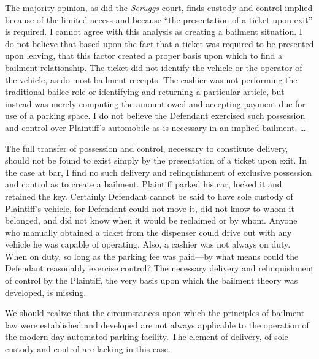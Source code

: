 The majority opinion, as did the \textit{Scruggs} court, finds custody and
control implied because of the limited access and because ``the presentation of
a ticket upon exit'' is required. I cannot agree with this analysis as creating
a bailment situation. I do not believe that based upon the fact that a ticket
was required to be presented upon leaving, that this factor created a proper
basis upon which to find a bailment relationship. The ticket did not identify
the vehicle or the operator of the vehicle, as do most bailment receipts. The
cashier was not performing the traditional bailee role or identifying and
returning a particular article, but instead was merely computing the amount
owed and accepting payment due for use of a parking space. I do not believe the
Defendant exercised such possession and control over Plaintiff's automobile as
is necessary in an implied bailment. \ldots

The full transfer of possession and control, necessary to constitute delivery,
should not be found to exist simply by the presentation of a ticket upon exit.
In the case at bar, I find no such delivery and relinquishment of exclusive
possession and control as to create a bailment. Plaintiff parked his car,
locked it and retained the key. Certainly Defendant cannot be said to have sole
custody of Plaintiff's vehicle, for Defendant could not move it, did not know
to whom it belonged, and did not know when it would be reclaimed or by whom.
Anyone who manually obtained a ticket from the dispenser could drive out with
any vehicle he was capable of operating. Also, a cashier was not always on
duty. When on duty, so long as the parking fee was paid---by what means could
the Defendant reasonably exercise control? The necessary delivery and
relinquishment of control by the Plaintiff, the very basis upon which the
bailment theory was developed, is missing.

We should realize that the circumstances upon which the principles of bailment
law were established and developed are not always applicable to the operation
of the modern day automated parking facility. The element of delivery, of sole
custody and control are lacking in this case.

